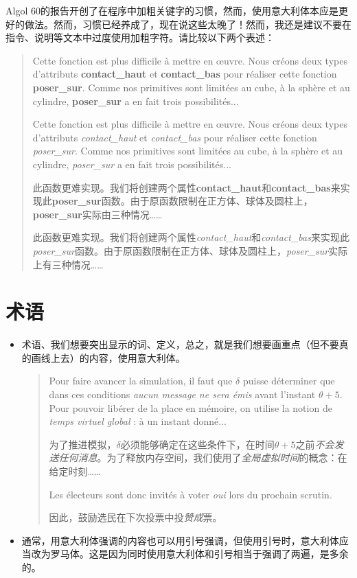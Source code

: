 Algol 60的报告开创了在程序中加粗关键字的习惯，然而，使用意大利体本应是更好的做法。然而，习惯已经养成了，现在说这些太晚了！然而，我还是建议不要在指令、说明等文本中过度使用加粗字符。请比较以下两个表述：

\begin{quote}
    Cette fonction est plus difficile à mettre en œuvre. Nous créons deux types d’attributs \textbf{contact\_haut} et \textbf{contact\_bas} pour réaliser cette fonction \textbf{poser\_sur}. Comme nos primitives sont limitées au cube, à la sphère et au cylindre, \textbf{poser\_sur} a en fait trois possibilités...

    Cette fonction est plus difficile à mettre en œuvre. Nous créons deux types d’attributs \emph{contact\_haut} et \emph{contact\_bas} pour réaliser cette fonction \emph{poser\_sur}. Comme nos primitives sont limitées au cube, à la sphère et au cylindre, \emph{poser\_sur} a en fait trois possibilités...

    \begin{bil}
        此函数更难实现。我们将创建两个属性\textbf{contact\_haut}和\textbf{contact\_bas}来实现此\textbf{poser\_sur}函数。由于原函数限制在正方体、球体及圆柱上，\textbf{poser\_sur}实际由三种情况……

        此函数更难实现。我们将创建两个属性\emph{contact\_haut}和\emph{contact\_bas}来实现此\emph{poser\_sur}函数。由于原函数限制在正方体、球体及圆柱上，\emph{poser\_sur}实际上有三种情况……
    \end{bil}
\end{quote}

\section{术语}

\begin{itemize}
    \item 术语、我们想要突出显示的词、定义，总之，就是我们想要画重点（但不要真的画线上去）的内容，使用意大利体。\\
    \begin{quote}  
        Pour faire avancer la simulation, il faut que $\delta$ puisse déterminer que dans ces conditions \emph{aucun message ne sera émis} avant l’instant $\theta + 5$. Pour pouvoir libérer de la place en mémoire, on utilise la notion de \emph{temps virtuel global} : à un instant donné...
        \begin{bil}
            为了推进模拟，$\delta$必须能够确定在这些条件下，在时间$\theta + 5$之前\emph{不会发送任何消息}。为了释放内存空间，我们使用了\emph{全局虚拟时间}的概念：在给定时刻……
        \end{bil}
        
        Les électeurs sont donc invités à voter \emph{oui} lors du prochain scrutin.
        \begin{bil}
            因此，鼓励选民在下次投票中投\emph{赞成}票。
        \end{bil}
    \end{quote}
    \item 通常，用意大利体强调的内容也可以用引号强调，但使用引号时，意大利体应当改为罗马体。这是因为同时使用意大利体和引号相当于强调了两遍，是多余的。
\end{itemize}

